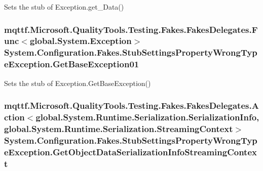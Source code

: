 Sets the stub of Exception.\-get\-\_\-\-Data()

\hypertarget{class_system_1_1_configuration_1_1_fakes_1_1_stub_settings_property_wrong_type_exception_a13c3418907aaeba798a3f38287e8a030}{
\subsubsection[{Get\-Base\-Exception01}]{\setlength{\rightskip}{0pt plus 5cm}mqttf.\-Microsoft.\-Quality\-Tools.\-Testing.\-Fakes.\-Fakes\-Delegates.\-Func$<$global.\-System.\-Exception$>$ System.\-Configuration.\-Fakes.\-Stub\-Settings\-Property\-Wrong\-Type\-Exception.\-Get\-Base\-Exception01}}\label{class_system_1_1_configuration_1_1_fakes_1_1_stub_settings_property_wrong_type_exception_a13c3418907aaeba798a3f38287e8a030}


Sets the stub of Exception.\-Get\-Base\-Exception()

\hypertarget{class_system_1_1_configuration_1_1_fakes_1_1_stub_settings_property_wrong_type_exception_a45af6c3e57b5da9adcab32fcb0680ceb}{
\subsubsection[{Get\-Object\-Data\-Serialization\-Info\-Streaming\-Context}]{\setlength{\rightskip}{0pt plus 5cm}mqttf.\-Microsoft.\-Quality\-Tools.\-Testing.\-Fakes.\-Fakes\-Delegates.\-Action$<$global.\-System.\-Runtime.\-Serialization.\-Serialization\-Info, global.\-System.\-Runtime.\-Serialization.\-Streaming\-Context$>$ System.\-Configuration.\-Fakes.\-Stub\-Settings\-Property\-Wrong\-Type\-Exception.\-Get\-Object\-Data\-Serialization\-Info\-Streaming\-Context}}\label{class_system_1_1_configuration_1_1_fakes_1_1_stub_settings_property_wrong_type_exception_a45af6c3e57b5da9adcab32fcb0680ceb}


